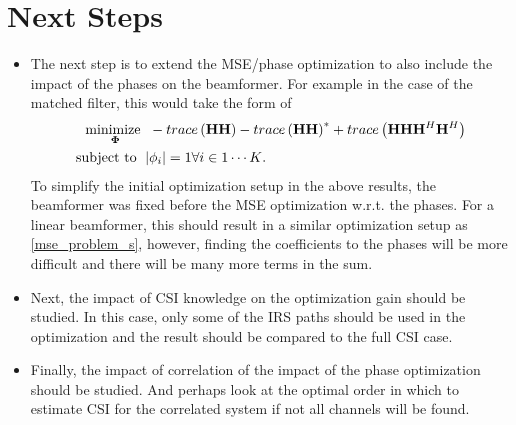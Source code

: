 \documentclass[12pt,a4paper]{report}
\begin{document}
\section{Next Steps}
\begin{itemize}
\item
The next step is to extend the MSE/phase optimization to also include the impact of the phases on the beamformer. For example in the case of the matched filter, this would take the form of 
		\begin{align}
	    \underset{\boldsymbol{\Phi}}{\text{minimize }}
	    & \; - \mathop{trace} \left( \mathbf{H}\mathbf{H}\right) - \mathop{trace} \left( \mathbf{H}\mathbf{H}\right)^* +
	    \mathop{trace}\left(\mathbf{H}\mathbf{H} \mathbf{H}^H \mathbf{H}^H\right)
	     \\
	    \text{subject to  } \; &
	    | \phi_i | = 1  \forall i \in {1 \cdots	 K}.
	\end{align}\label{mse_problem_full}
To simplify the initial optimization setup in the above results, the beamformer was fixed before the MSE optimization w.r.t. the phases. For a linear beamformer, this should result in a similar optimization setup as \ref{mse_problem_s}, however, finding the coefficients to the phases will be more difficult and there will be many more terms in the sum.  
\item
	Next, the impact of CSI knowledge on the optimization gain should be studied. In this case, only some of the IRS paths should be used in the optimization and the result should be compared to the full CSI case. 
\item
	Finally, the impact of correlation of the impact of the phase optimization should be studied. And perhaps look at the optimal order in which to estimate CSI for the correlated system if not all channels will be found. 
\end{itemize}

\end{document}
